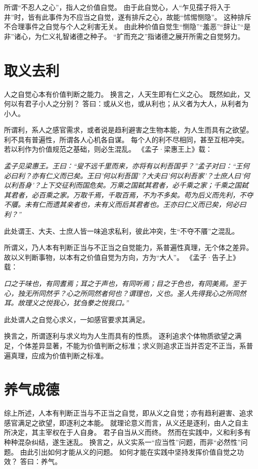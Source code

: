 \documentclass[11pt]{article}
\begin{document}
所谓“不忍人之心”，指人之价值自觉。
由于此自觉心，人“乍见孺子将入于井”时，皆有此事件为不应当之自觉，遂有排斥之心，故能“怵惕恻隐”。
这种排斥不合理事件之自觉与个人之利害无关。
由此种价值自觉生“恻隐”“羞恶”“辞让”“是非”诸心，为仁义礼智诸德之种子。
“扩而充之”指诸德之展开所需之自觉努力。

\section{取义去利}
人之自觉心本有价值判断之能力。
换言之，人天生即有仁义之心。
既然如此，又何以有君子小人之分别？
答曰：或从义也，或从利也；从义者为大人，从利者为小人。

\par

所谓利，系人之感官需求，或者说是趋利避害之生物本能，为人生而具有之欲望。
利不具有普遍性，所谓各人心机各自谋。
每个人的利不尽相同，甚至互相冲突。
若以利作为价值规范之基础，则必生混乱。
《孟子·梁惠王上》载：

\textit{孟子见梁惠王。王曰：“叟不远千里而来，亦将有以利吾国乎？”孟子对曰：“王何必曰利？亦有仁义而已矣。王曰’何以利吾国’？大夫曰’何以利吾家’？士庶人曰’何以利吾身’？上下交征利而国危矣。万乘之国弑其君者，必千乘之家；千乘之国弑其君者，必百乘之家。万取千焉，千取百焉，不为不多矣。苟为后义而先利，不夺不餍。未有仁而遗其亲者也，未有义而后其君者也。王亦曰仁义而已矣，何必曰利？”}

此处谓王、大夫、士庶人皆一味追求私利，彼此冲突，生“不夺不餍”之混乱。

\par

所谓义，乃人本有判断正当与不正当之自觉能力，系普遍性真理，无个体之差异。
故以义判断事物，以本有之价值自觉为方向，方为“大人”。
《孟子·告子上》载：

\textit{口之于味也，有同耆焉；耳之于声也，有同听焉；目之于色也，有同美焉。至于心，独无所同然乎？心之所同然者何也？谓理也，义也。圣人先得我心之所同然耳。故理义之悦我心，犹刍豢之悦我口。”}

此处谓人之自觉心求义，一如感官要求其满足。

\par

换言之，所谓逐利与求义均为人生而具有的性质。
逐利追求个体物质欲望之满足，个体差异显著，不能为价值判断之标准；求义则追求正当并否定不正当，系普遍真理，应成为价值判断之标准。
  
\section{养气成德}
综上所述，人本有判断正当与不正当之自觉，即从义之自觉；亦有趋利避害、追求感官满足之欲望，即逐利之本能。
就理论意义而言，从义还是逐利，由人之自主所决定，其主宰权在于人自身。
君子自当从义而终。
然而在实践中，义和利多有种种混杂纠结，遂生迷乱。
换言之，从义实系一“应当性”问题，而非“必然性”问题。
由此引出如何才能从义的问题。
如何才能在实践中坚持发挥价值自觉之功效？
答曰：养气。
\end{document}
